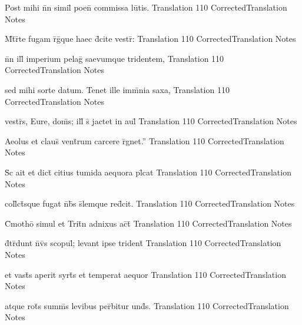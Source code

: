 \documentclass[]{book}
\begin{document}
\newpage

\latline
  {Post mihi n\={}n simil\={\macron {\i}} poen\={} commissa lu\={}tis.}
  { Translation }
  {110}
  { CorrectedTranslation }
  { Notes }


\latline
  {M\={}t\={}r\={}te fugam r\={}g\={\macron {\i}}que haec d\={\macron {\i}}cite vestr\={}:}
  { Translation }
  {110}
  { CorrectedTranslation }
  { Notes }


\latline
  {n\={}n ill\={\macron {\i}} imperium pelag\={\macron {\i}} saevumque tridentem,}
  { Translation }
  {110}
  { CorrectedTranslation }
  { Notes }



\newpage

\latline
  {sed mihi sorte datum.  Tenet ille imm\={}nia saxa,}
  { Translation }
  {110}
  { CorrectedTranslation }
  { Notes }


\latline
  {vestr\={}s, Eure, dom\={}s; ill\={} s\={} jactet in aul\={}}
  { Translation }
  {110}
  { CorrectedTranslation }
  { Notes }


\latline
  {Aeolus et claus\={} vent\={}rum carcere r\={}gnet.''}
  { Translation }
  {110}
  { CorrectedTranslation }
  { Notes }



\newpage

\latline
  {S\={\macron {\i}}c ait et dict\={} citius tumida aequora pl\={}cat}
  { Translation }
  {110}
  { CorrectedTranslation }
  { Notes }


\latline
  {coll\={}ct\={}sque fugat n\={}b\={}s s\={}lemque red\={}cit.}
  { Translation }
  {110}
  { CorrectedTranslation }
  { Notes }


\latline
  {C\={}motho\={} simul et Trit\={}n adnixus ac\={}t\={}}
  { Translation }
  {110}
  { CorrectedTranslation }
  { Notes }



\newpage

\latline
  {d\={}tr\={}dunt n\={}v\={\macron {\i}}s scopul\={}; levant ipse trident\={\macron {\i}}}
  { Translation }
  {110}
  { CorrectedTranslation }
  { Notes }


\latline
  {et vast\={}s aperit syrt\={\macron {\i}}s et temperat aequor}
  { Translation }
  {110}
  { CorrectedTranslation }
  { Notes }


\latline
  {atque rot\={\macron {\i}}s summ\={}s levibus per\={}bitur und\={}s.}
  { Translation }
  {110}
  { CorrectedTranslation }
  { Notes }



\newpage
\end{document}

